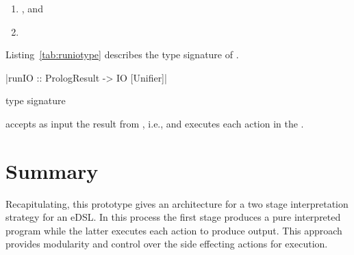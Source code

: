 \documentclass[thesis-solanki.tex]{subfiles}
\begin{document}
\begin{enumerate}
\item {}, and

\item {} 
\end{enumerate} 
 

Listing~\ref{tab:runiotype} describes the type signature of .
\begin{code-list}[H]
\begin{singlespace}
|runIO :: PrologResult -> IO [Unifier]| 
\end{singlespace}
\caption{ type signature}
\label{tab:runiotype}
\end{code-list}

 accepts as input the result from , i.e.,  and executes
each action in the .

\section{Summary}
Recapitulating, this prototype gives an architecture for a two stage interpretation strategy for an eDSL. In 
this process the first stage produces a pure interpreted program while the latter executes each action to produce output. This approach 
provides modularity and control over the side effecting actions for execution.   


\ifMain\ifDraft
\begin{scope}
  \nolinenumbers
  \enotesize
  \par
  \begin{singlespace}
  \setlength{\parskip}{12pt plus 2pt minus 1pt}
  \theendnotes
  \par
  \end{singlespace}
\end{scope}
\fi\fi
\end{document}
